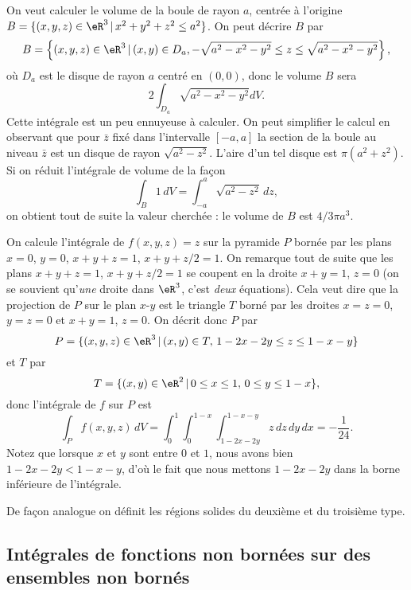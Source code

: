\begin{example}
	On veut calculer le volume de la boule de rayon \( a\), centrée à l'origine \( B=\{(x,y,z)\in\eR^3\,\vert\, x^2+y^2+z^2\leq a^2 \}\). On peut décrire \( B\) par
	\[
		B=\left\{(x,y,z)\in\eR^3\,\vert\, (x,y)\in D_a, -\sqrt{a^2-x^2-y^2}\leq z\leq \sqrt{a^2-x^2-y^2}  \right\},
	\]
	où \( D_a\) est le disque de rayon \( a\) centré en \( (0,0)\), donc le volume \( B\) sera
	\[
		2 \int_{D_a}\sqrt{a^2-x^2-y^2} dV.
	\]
	Cette intégrale est un peu ennuyeuse à calculer. On peut simplifier le calcul en observant que pour \( \bar z\) fixé dans l'intervalle \( [-a,a]\) la section de la boule au niveau \( \bar z\) est un disque de rayon \( \sqrt{a^2-z^2}\). L'aire d'un tel disque est  \( \pi (a^2+z^2)\). Si on réduit l'intégrale de volume de la façon
	\[
		\int_{B} 1\, dV=\int_{-a}^{a}  \sqrt{a^2-z^2}\, dz,
	\]
	on obtient tout de suite la valeur cherchée : le volume de \( B\) est \( 4/3 \pi a^3\).
\end{example}
\begin{example}
	On calcule l'intégrale de \( f(x,y,z)=z\) sur la pyramide \( P\) bornée par les plans \( x=0\), \( y=0\), \( x+y+z=1\), \( x+y+z/2=1\). On remarque tout de suite que les plans \( x+y+z=1\), \( x+y+z/2=1\) se coupent en la droite \( x+y=1\), \( z=0\) (on se souvient qu'\emph{une} droite dans \( \eR^3\), c'est \emph{deux} équations). Cela veut dire que la projection de \( P\) sur le plan \( x\)-\( y\) est le  triangle \( T\) borné par les droites \( x=z=0\), \( y=z=0\) et \( x+y=1\), \( z=0\).
	On  décrit donc \( P\) par
	\[
		P=\{(x,y,z)\in\eR^3\,\vert\, (x,y)\in T, \, 1-2x-2y\leq z\leq 1-x-y\}
	\]
	et \( T\) par
	\[
		T=\{(x,y)\in\eR^2\,\vert\, 0\leq x\leq 1,\,  0\leq y\leq 1-x\},
	\]
	donc l'intégrale de \( f\) sur \( P\) est
	\[
		\int_Pf(x,y,z)\, dV= \int_{0}^{1}\int_{0}^{1-x}\int_{1-2x-2y}^{1-x-y}z \,dz\,dy\,dx=-\frac{1}{ 24 }.
	\]
	Notez que lorsque \( x\) et \( y\) sont entre \( 0\) et \( 1\), nous avons bien \( 1-2x-2y<1-x-y\), d'où le fait que nous mettons \( 1-2x-2y\) dans la borne inférieure de l'intégrale.
\end{example}

De façon analogue on définit les régions solides du deuxième et du troisième type.

\subsection[Fonctions et ensembles non bornés]{Intégrales de fonctions non bornées sur des ensembles non bornés}


